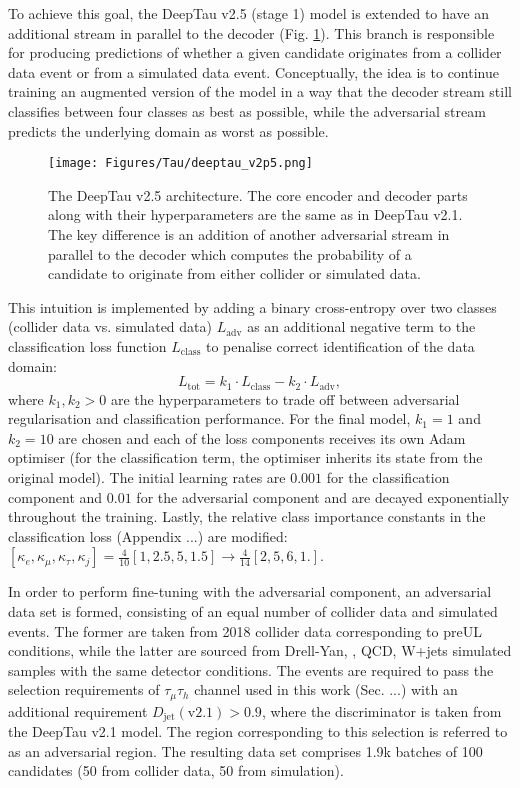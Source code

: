 To achieve this goal, the DeepTau v2.5 (stage 1) model is extended to have an additional stream in parallel to the decoder (Fig. \ref{fig:deeptau_v2p5_arch}). This branch is responsible for producing predictions of whether a given \tauh candidate originates from a collider data event or from a simulated data event. Conceptually, the idea is to continue training an augmented version of the model in a way that the decoder stream still classifies between four classes as best as possible, while the adversarial stream predicts the underlying \tauh domain as worst as possible. 

\begin{figure}[ht!]
    \centering
    \texttt{[image: Figures/Tau/deeptau\_v2p5.png]}
    \caption{The DeepTau v2.5 architecture. The core encoder and decoder parts along with their hyperparameters are the same as in DeepTau v2.1. The key difference is an addition of another adversarial stream in parallel to the decoder which computes the probability of a \tauh candidate to originate from either collider or simulated data.}
    \label{fig:deeptau_v2p5_arch}
\end{figure}

This intuition is implemented by adding a binary cross-entropy over two classes (collider data vs. simulated data) $L_\text{adv}$ as an additional negative term to the classification loss function $L_\text{class}$ to penalise correct identification of the data domain:
\begin{equation}
    L_\text{tot} = k_1 \cdot L_\text{class} - k_2 \cdot L_\text{adv},
\end{equation}\label{eq:adv_loss}
where $k_1, k_2 > 0$ are the hyperparameters to trade off between adversarial regularisation and classification performance. For the final model, $k_1=1$ and $k_2=10$ are chosen and each of the loss components receives its own Adam optimiser (for the classification term, the optimiser inherits its state from the original model). The initial learning rates are $0.001$ for the classification component and $0.01$ for the adversarial component and are decayed exponentially throughout the training. Lastly, the relative class importance constants in the classification loss (Appendix ...) are modified: $[\kappa_e, \kappa_\mu, \kappa_\tau, \kappa_j] = \frac{4}{10}[1, 2.5, 5, 1.5] \to \frac{4}{14}[2, 5, 6, 1.]$.  

In order to perform fine-tuning with the adversarial component, an adversarial data set is formed, consisting of an equal number of collider data and simulated events. The former are taken from 2018 collider data corresponding to preUL conditions, while the latter are sourced from Drell-Yan, \ttbar, QCD, W+jets simulated samples with the same detector conditions. The events are required to pass the selection requirements of $\tau_\mu \tau_h$ channel used in this work (Sec. ...) with an additional requirement $D_\text{jet}(\text{v2.1}) > 0.9$, where the discriminator is taken from the DeepTau v2.1 model. The region corresponding to this selection is referred to as an adversarial region. The resulting data set comprises 1.9k batches of 100 \tauh candidates (50 from collider data, 50 from simulation).

